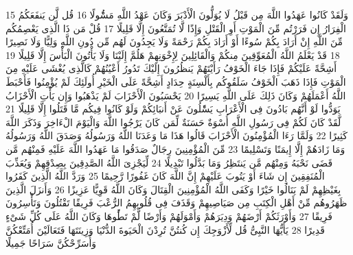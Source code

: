 \documentclass[20pt,a4paper]{article}
\begin{document}
{\tiny\colorbox{cl_aya}{15}} وَلَقَدْ كَانُوا عَهَدُوا اللَّهَ مِن قَبْلُ لَا يُوَلُّونَ الْأَدْبَرَ وَكَانَ عَهْدُ اللَّهِ مَسُْٔولًا
{\tiny\colorbox{cl_aya}{16}} قُل لَّن يَنفَعَكُمُ الْفِرَارُ إِن فَرَرْتُم مِّنَ الْمَوْتِ أَوِ الْقَتْلِ وَإِذًا لَّا تُمَتَّعُونَ إِلَّا قَلِيلًا
{\tiny\colorbox{cl_aya}{17}} قُلْ مَن ذَا الَّذِى يَعْصِمُكُم مِّنَ اللَّهِ إِنْ أَرَادَ بِكُمْ سُوءًا أَوْ أَرَادَ بِكُمْ رَحْمَةً وَلَا يَجِدُونَ لَهُم مِّن دُونِ اللَّهِ وَلِيًّا وَلَا نَصِيرًا
{\tiny\colorbox{cl_aya}{18}} قَدْ يَعْلَمُ اللَّهُ الْمُعَوِّقِينَ مِنكُمْ وَالْقَائِلِينَ لِإِخْوَنِهِمْ هَلُمَّ إِلَيْنَا وَلَا يَأْتُونَ الْبَأْسَ إِلَّا قَلِيلًا
{\tiny\colorbox{cl_aya}{19}} أَشِحَّةً عَلَيْكُمْ فَإِذَا جَاءَ الْخَوْفُ رَأَيْتَهُمْ يَنظُرُونَ إِلَيْكَ تَدُورُ أَعْيُنُهُمْ كَالَّذِى يُغْشَى عَلَيْهِ مِنَ الْمَوْتِ فَإِذَا ذَهَبَ الْخَوْفُ سَلَقُوكُم بِأَلْسِنَةٍ حِدَادٍ أَشِحَّةً عَلَى الْخَيْرِ أُولَئِكَ لَمْ يُؤْمِنُوا فَأَحْبَطَ اللَّهُ أَعْمَلَهُمْ وَكَانَ ذَلِكَ عَلَى اللَّهِ يَسِيرًا
{\tiny\colorbox{cl_aya}{20}} يَحْسَبُونَ الْأَحْزَابَ لَمْ يَذْهَبُوا وَإِن يَأْتِ الْأَحْزَابُ يَوَدُّوا لَوْ أَنَّهُم بَادُونَ فِى الْأَعْرَابِ يَسَْٔلُونَ عَنْ أَنبَائِكُمْ وَلَوْ كَانُوا فِيكُم مَّا قَتَلُوا إِلَّا قَلِيلًا
{\tiny\colorbox{cl_aya}{21}} لَّقَدْ كَانَ لَكُمْ فِى رَسُولِ اللَّهِ أُسْوَةٌ حَسَنَةٌ لِّمَن كَانَ يَرْجُوا اللَّهَ وَالْيَوْمَ الْءَاخِرَ وَذَكَرَ اللَّهَ كَثِيرًا
{\tiny\colorbox{cl_aya}{22}} وَلَمَّا رَءَا الْمُؤْمِنُونَ الْأَحْزَابَ قَالُوا هَذَا مَا وَعَدَنَا اللَّهُ وَرَسُولُهُ وَصَدَقَ اللَّهُ وَرَسُولُهُ وَمَا زَادَهُمْ إِلَّا إِيمَنًا وَتَسْلِيمًا
{\tiny\colorbox{cl_aya}{23}} مِّنَ الْمُؤْمِنِينَ رِجَالٌ صَدَقُوا مَا عَهَدُوا اللَّهَ عَلَيْهِ فَمِنْهُم مَّن قَضَى نَحْبَهُ وَمِنْهُم مَّن يَنتَظِرُ وَمَا بَدَّلُوا تَبْدِيلًا
{\tiny\colorbox{cl_aya}{24}} لِّيَجْزِىَ اللَّهُ الصَّدِقِينَ بِصِدْقِهِمْ وَيُعَذِّبَ الْمُنَفِقِينَ إِن شَاءَ أَوْ يَتُوبَ عَلَيْهِمْ إِنَّ اللَّهَ كَانَ غَفُورًا رَّحِيمًا
{\tiny\colorbox{cl_aya}{25}} وَرَدَّ اللَّهُ الَّذِينَ كَفَرُوا بِغَيْظِهِمْ لَمْ يَنَالُوا خَيْرًا وَكَفَى اللَّهُ الْمُؤْمِنِينَ الْقِتَالَ وَكَانَ اللَّهُ قَوِيًّا عَزِيزًا
{\tiny\colorbox{cl_aya}{26}} وَأَنزَلَ الَّذِينَ ظَهَرُوهُم مِّنْ أَهْلِ الْكِتَبِ مِن صَيَاصِيهِمْ وَقَذَفَ فِى قُلُوبِهِمُ الرُّعْبَ فَرِيقًا تَقْتُلُونَ وَتَأْسِرُونَ فَرِيقًا
{\tiny\colorbox{cl_aya}{27}} وَأَوْرَثَكُمْ أَرْضَهُمْ وَدِيَرَهُمْ وَأَمْوَلَهُمْ وَأَرْضًا لَّمْ تَطَُٔوهَا وَكَانَ اللَّهُ عَلَى كُلِّ شَىْءٍ قَدِيرًا
{\tiny\colorbox{cl_aya}{28}} يَأَيُّهَا النَّبِىُّ قُل لِّأَزْوَجِكَ إِن كُنتُنَّ تُرِدْنَ الْحَيَوةَ الدُّنْيَا وَزِينَتَهَا فَتَعَالَيْنَ أُمَتِّعْكُنَّ وَأُسَرِّحْكُنَّ سَرَاحًا جَمِيلًا
\end{document}
